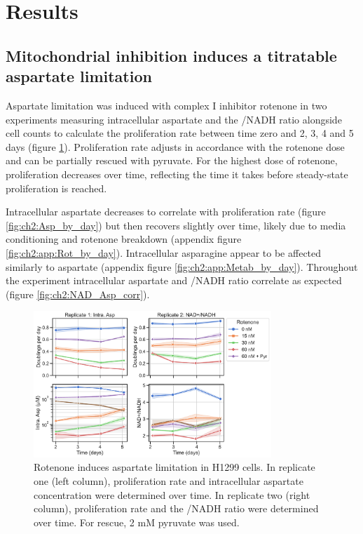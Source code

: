\section{Results}
\subsection{Mitochondrial inhibition induces a titratable aspartate limitation}
Aspartate limitation was induced with complex I inhibitor rotenone in two experiments measuring intracellular aspartate and the \NAD{}/NADH ratio alongside cell counts to calculate the proliferation rate between time zero and 2, 3, 4 and 5 days (figure \ref{fig:ch2:NAD_Asp_time}).
Proliferation rate adjusts in accordance with the rotenone dose and can be partially rescued with pyruvate.
For the highest dose of rotenone, proliferation decreases over time, reflecting the time it takes before steady-state proliferation is reached.

Intracellular aspartate decreases to correlate with proliferation rate (figure \ref{fig:ch2:Asp_by_day}) but then recovers slightly over time, likely due to media conditioning and rotenone breakdown (appendix figure \ref{fig:ch2:app:Rot_by_day}).
Intracellular asparagine appear to be affected similarly to aspartate (appendix figure \ref{fig:ch2:app:Metab_by_day}).
Throughout the experiment intracellular aspartate and \NAD{}/NADH ratio correlate as expected (figure \ref{fig:ch2:NAD_Asp_corr}).

\begin{figure}
    \centering
    \includegraphics[width=0.8\textwidth]{figures/chap2/prlfr-asp-NAD-NADH-time_rep1-2.pdf}
    \caption[Aspartate, \NAD{}/NADH ratio over time after rotenone.]{
    Rotenone induces aspartate limitation in H1299 cells.
    In replicate one (left column), proliferation rate and intracellular aspartate concentration were determined over time.
    In replicate two (right column), proliferation rate and the \NAD{}/NADH ratio were determined over time.
    For rescue, 2 mM pyruvate was used.
    }
    \label{fig:ch2:NAD_Asp_time}
\end{figure}


